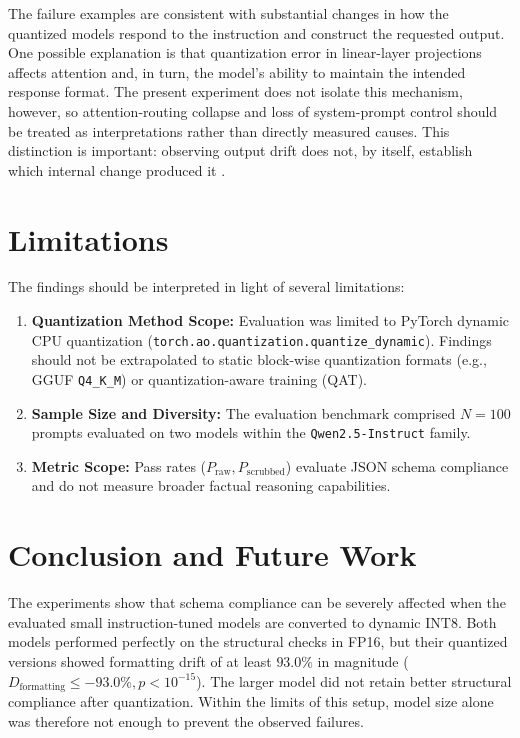 \documentclass[10pt, conference, a4paper]{IEEEtran}
\begin{document}
The failure examples are consistent with substantial changes in how the quantized models respond to the instruction and construct the requested output. One possible explanation is that quantization error in linear-layer projections affects attention and, in turn, the model's ability to maintain the intended response format. The present experiment does not isolate this mechanism, however, so attention-routing collapse and loss of system-prompt control should be treated as interpretations rather than directly measured causes. This distinction is important: observing output drift does not, by itself, establish which internal change produced it \cite{chen2021,chen2023}.

\section{Limitations}

The findings should be interpreted in light of several limitations:
\begin{enumerate}
    \item \textbf{Quantization Method Scope:} Evaluation was limited to PyTorch dynamic CPU quantization (\texttt{torch.ao.quantization.quantize\_dynamic}). Findings should not be extrapolated to static block-wise quantization formats (e.g., GGUF \texttt{Q4\_K\_M}) or quantization-aware training (QAT).
    \item \textbf{Sample Size and Diversity:} The evaluation benchmark comprised $N=100$ prompts evaluated on two models within the \texttt{Qwen2.5-Instruct} family.
    \item \textbf{Metric Scope:} Pass rates ($P_{\text{raw}}, P_{\text{scrubbed}}$) evaluate JSON schema compliance and do not measure broader factual reasoning capabilities.
\end{enumerate}

\section{Conclusion and Future Work}
The experiments show that schema compliance can be severely affected when the evaluated small instruction-tuned models are converted to dynamic $\text{INT8}$. Both models performed perfectly on the structural checks in FP16, but their quantized versions showed formatting drift of at least $93.0\%$ in magnitude ($D_{\text{formatting}} \le -93.0\%, p < 10^{-15}$). The larger model did not retain better structural compliance after quantization. Within the limits of this setup, model size alone was therefore not enough to prevent the observed failures.
\end{document}
